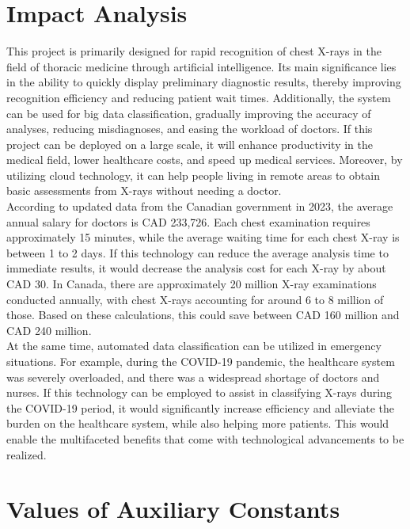 \documentclass[12pt]{article}
\begin{document}
\section{Impact Analysis}
This project is primarily designed for rapid recognition of chest X-rays in the field of thoracic medicine through artificial intelligence. Its main significance lies in the ability to quickly display preliminary diagnostic results, thereby improving recognition efficiency and reducing patient wait times. Additionally, the system can be used for big data classification, gradually improving the accuracy of analyses, reducing misdiagnoses, and easing the workload of doctors. If this project can be deployed on a large scale, it will enhance productivity in the medical field, lower healthcare costs, and speed up medical services. Moreover, by utilizing cloud technology, it can help people living in remote areas to obtain basic assessments from X-rays without needing a doctor. \\

According to updated data from the Canadian government in 2023, the average annual salary for doctors is CAD 233,726. Each chest examination requires approximately 15 minutes, while the average waiting time for each chest X-ray is between 1 to 2 days. If this technology can reduce the average analysis time to immediate results, it would decrease the analysis cost for each X-ray by about CAD 30. In Canada, there are approximately 20 million X-ray examinations conducted annually, with chest X-rays accounting for around 6 to 8 million of those. Based on these calculations, this could save between CAD 160 million and CAD 240 million. \\

At the same time, automated data classification can be utilized in emergency situations. For example, during the COVID-19 pandemic, the healthcare system was severely overloaded, and there was a widespread shortage of doctors and nurses. If this technology can be employed to assist in classifying X-rays during the COVID-19 period, it would significantly increase efficiency and alleviate the burden on the healthcare system, while also helping more patients. This would enable the multifaceted benefits that come with technological advancements to be realized. \\

\section{Values of Auxiliary Constants}
\end{document}
